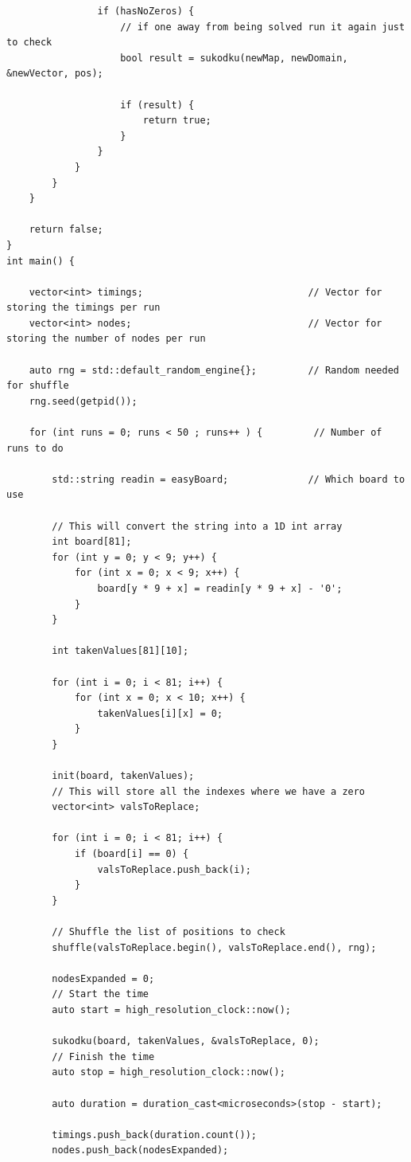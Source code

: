 \documentclass{article}
\begin{document}
\begin{titlepage}
\begin{lstlisting}
                if (hasNoZeros) {
                    // if one away from being solved run it again just to check
                    bool result = sukodku(newMap, newDomain, &newVector, pos);

                    if (result) {
                        return true;
                    }
                }
            }
        }
    }

    return false;
}
int main() {

    vector<int> timings;                             // Vector for storing the timings per run
    vector<int> nodes;                               // Vector for storing the number of nodes per run

    auto rng = std::default_random_engine{};         // Random needed for shuffle
    rng.seed(getpid());

    for (int runs = 0; runs < 50 ; runs++ ) {         // Number of runs to do

        std::string readin = easyBoard;              // Which board to use

        // This will convert the string into a 1D int array
        int board[81];
        for (int y = 0; y < 9; y++) {
            for (int x = 0; x < 9; x++) {
                board[y * 9 + x] = readin[y * 9 + x] - '0';
            }
        }

        int takenValues[81][10];

        for (int i = 0; i < 81; i++) {
            for (int x = 0; x < 10; x++) {
                takenValues[i][x] = 0;
            }
        }

        init(board, takenValues);
        // This will store all the indexes where we have a zero
        vector<int> valsToReplace;

        for (int i = 0; i < 81; i++) {
            if (board[i] == 0) {
                valsToReplace.push_back(i);
            }
        }

        // Shuffle the list of positions to check
        shuffle(valsToReplace.begin(), valsToReplace.end(), rng);

        nodesExpanded = 0;
        // Start the time
        auto start = high_resolution_clock::now();

        sukodku(board, takenValues, &valsToReplace, 0);
        // Finish the time
        auto stop = high_resolution_clock::now();

        auto duration = duration_cast<microseconds>(stop - start);

        timings.push_back(duration.count());
        nodes.push_back(nodesExpanded);


\end{lstlisting}
\end{titlepage}
\end{document}
